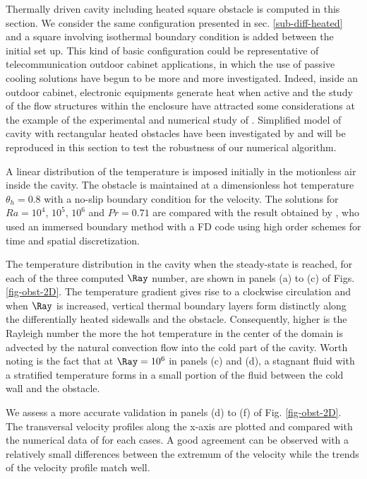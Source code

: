 Thermally driven cavity including heated square obstacle is computed in this section.
We consider the same configuration presented in sec. \ref{sub-diff-heated} and a square involving isothermal boundary condition is added between the initial set up.
This kind of basic configuration could be representative of telecommunication outdoor cabinet applications, in which the use of passive cooling solutions have begun to be more and more investigated.
Indeed, inside an outdoor cabinet, electronic equipments generate heat when active and the study of the flow structures within the enclosure have attracted some considerations at the example of the experimental and numerical study of \cite{Raluca2013}.
Simplified model of cavity with rectangular heated obstacles have been investigated by \cite{Raluca2013} and will be reproduced in this section to test the robustness of our numerical algorithm.

A linear distribution of the temperature is imposed initially in the motionless air inside the cavity.
The obstacle is maintained at a dimensionless hot temperature $\theta_h = 0.8$ with a no-slip boundary condition for the velocity.
The solutions for $Ra = 10^4$, $10^5$, $10^6$ and $Pr = 0.71$ are compared with the result obtained by \cite{Raluca2013}, who used an immersed boundary method with a FD code using high order schemes for time and spatial discretization.

The temperature distribution in the cavity when the steady-state is reached, for each of the three computed $\Ray$ number, are shown in panels (a) to (c) of Figs. \ref{fig-obst-2D}.
The temperature gradient gives rise to a clockwise circulation and when $\Ray$ is increased, vertical thermal boundary layers form distinctly along the differentially heated sidewalls and the obstacle.
Consequently, 
higher is the Rayleigh number the more the hot temperature in the center of the domain is advected by the natural convection flow into the cold part of the cavity. 
Worth noting is the fact that at $\Ray = 10^6$ in panels (c) and (d), a stagnant fluid with a stratified temperature forms in a small portion of the fluid between the cold wall and the obstacle.

We assess a more accurate validation in panels (d) to (f) of Fig. \ref{fig-obst-2D}.
The transversal velocity profiles along the x-axis are plotted and compared with the numerical data of \cite{Raluca2013} for each cases. 
A good agreement can be observed with a relatively small differences between the extremum of the velocity while the trends of the velocity profile match well.

